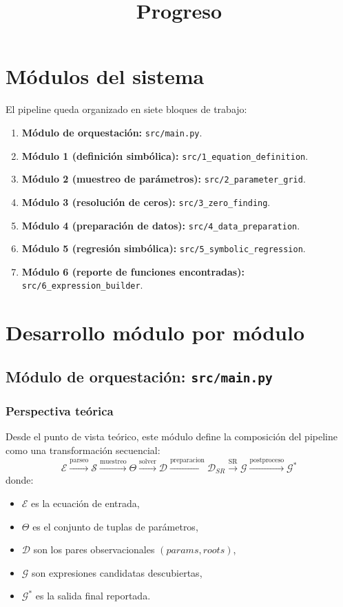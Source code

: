 \documentclass[12pt]{article}
\title{Progreso}
\begin{document}
\maketitle
\tableofcontents
\newpage

\section{Módulos del sistema}
El pipeline queda organizado en siete bloques de trabajo:
\begin{enumerate}[leftmargin=1.5em]
    \item \textbf{Módulo de orquestación:} \texttt{src/main.py}.
    \item \textbf{Módulo 1 (definición simbólica):} \texttt{src/1\_equation\_definition}.
    \item \textbf{Módulo 2 (muestreo de parámetros):} \texttt{src/2\_parameter\_grid}.
    \item \textbf{Módulo 3 (resolución de ceros):} \texttt{src/3\_zero\_finding}.
    \item \textbf{Módulo 4 (preparación de datos):} \texttt{src/4\_data\_preparation}.
    \item \textbf{Módulo 5 (regresión simbólica):} \texttt{src/5\_symbolic\_regression}.
    \item \textbf{Módulo 6 (reporte de funciones encontradas):} \texttt{src/6\_expression\_builder}.
\end{enumerate}

\section{Desarrollo módulo por módulo}

\subsection{Módulo de orquestación: \texttt{src/main.py}}
\subsubsection*{Perspectiva teórica}
Desde el punto de vista teórico, este módulo define la composición del pipeline como una transformación secuencial:
\[
\mathcal{E} \xrightarrow{\text{parseo}} \mathcal{S} \xrightarrow{\text{muestreo}} \Theta
\xrightarrow{\text{solver}} \mathcal{D}
\xrightarrow{\text{preparacion}} \mathcal{D}_{SR}
\xrightarrow{\text{SR}} \mathcal{G}
\xrightarrow{\text{postproceso}} \mathcal{G}^{*}
\]
donde:
\begin{itemize}[leftmargin=1.5em]
    \item $\mathcal{E}$ es la ecuación de entrada,
    \item $\Theta$ es el conjunto de tuplas de parámetros,
    \item $\mathcal{D}$ son los pares observacionales \((params, roots)\),
    \item $\mathcal{G}$ son expresiones candidatas descubiertas,
    \item $\mathcal{G}^{*}$ es la salida final reportada.
\end{itemize}
\end{document}
